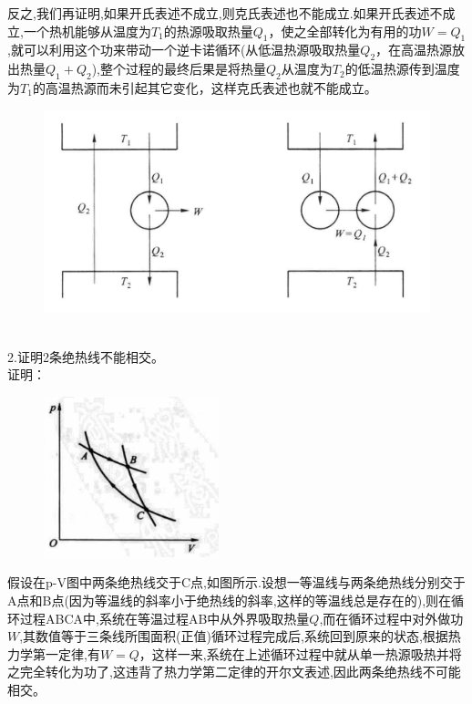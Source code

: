 \documentclass[12pt]{article}
\begin{document}
反之,我们再证明,如果开氏表述不成立,则克氏表述也不能成立.如果开氏表述不成立,一个热机能够从温度为$T_1$的热源吸取热量$Q_1$，使之全部转化为有用的功$W=Q_1$,就可以利用这个功来带动一个逆卡诺循环(从低温热源吸取热量$Q_2$，在高温热源放出热量$Q_1+Q_2$),整个过程的最终后果是将热量$Q_2$从温度为$T_2$的低温热源传到温度为$T_1$的高温热源而未引起其它变化，这样克氏表述也就不能成立。
\begin{figure}[h]
		\centering
	\includegraphics[scale=0.2]{F2.png}
\end{figure}
\\
\noindent
2.证明2条绝热线不能相交。\\
证明：

\begin{figure}
	\begin{center}
		\includegraphics[width=2in]{F3.png}
		\label{F3}
	\end{center}
\end{figure}
假设在p-V图中两条绝热线交于C点,如图所示.设想一等温线与两条绝热线分别交于A点和B点(因为等温线的斜率小于绝热线的斜率,这样的等温线总是存在的),则在循环过程ABCA中,系统在等温过程AB中从外界吸取热量$Q$,而在循环过程中对外做功$W$,其数值等于三条线所围面积(正值)循环过程完成后,系统回到原来的状态,根据热力学第一定律,有$W=Q$，这样一来,系统在上述循环过程中就从单一热源吸热并将之完全转化为功了,这违背了热力学第二定律的开尔文表述,因此两条绝热线不可能相交。
\\
\end{document}
